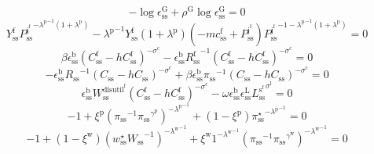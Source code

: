 \begin{equation}
-\log{\epsilon^{\mathrm{G}}_\mathrm{ss}} + {\rho^{\mathrm{G}}} {\log{\epsilon^{\mathrm{G}}_\mathrm{ss}}} = 0
\end{equation}
\begin{equation}
{Y^{\mathrm{f}}_\mathrm{ss}} {{P^{\mathrm{j}^{\mathrm{f}}}_\mathrm{ss}}^{-{\lambda^{\mathrm{p}}}^{-1} \left(1 + \lambda^{\mathrm{p}}\right)}} - {\lambda^{\mathrm{p}}}^{-1} {Y^{\mathrm{f}}_\mathrm{ss}} \left(1 + \lambda^{\mathrm{p}}\right) \left(-{m\!c}^{\mathrm{f}}_\mathrm{ss} + P^{\mathrm{j}^{\mathrm{f}}}_\mathrm{ss}\right) {{P^{\mathrm{j}^{\mathrm{f}}}_\mathrm{ss}}^{-1 - {\lambda^{\mathrm{p}}}^{-1} \left(1 + \lambda^{\mathrm{p}}\right)}} = 0
\end{equation}
\begin{equation}
{\beta} {\epsilon^{\mathrm{b}}_\mathrm{ss}} {\left(C^{\mathrm{f}}_\mathrm{ss} - {h} {C^{\mathrm{f}}_\mathrm{ss}}\right)^{-\sigma^{\mathrm{c}}}} - {\epsilon^{\mathrm{b}}_\mathrm{ss}} {R^{\mathrm{f}}_\mathrm{ss}}^{-1} {\left(C^{\mathrm{f}}_\mathrm{ss} - {h} {C^{\mathrm{f}}_\mathrm{ss}}\right)^{-\sigma^{\mathrm{c}}}} = 0
\end{equation}
\begin{equation}
-{\epsilon^{\mathrm{b}}_\mathrm{ss}} {R_\mathrm{ss}}^{-1} {\left(C_\mathrm{ss} - {h} {C_\mathrm{ss}}\right)^{-\sigma^{\mathrm{c}}}} + {\beta} {\epsilon^{\mathrm{b}}_\mathrm{ss}} {\pi_\mathrm{ss}}^{-1} {\left(C_\mathrm{ss} - {h} {C_\mathrm{ss}}\right)^{-\sigma^{\mathrm{c}}}} = 0
\end{equation}
\begin{equation}
{\epsilon^{\mathrm{b}}_\mathrm{ss}} {W^{\mathrm{disutil}^{\mathrm{f}}}_\mathrm{ss}} {\left(C^{\mathrm{f}}_\mathrm{ss} - {h} {C^{\mathrm{f}}_\mathrm{ss}}\right)^{-\sigma^{\mathrm{c}}}} - {\omega} {\epsilon^{\mathrm{b}}_\mathrm{ss}} {\epsilon^{\mathrm{L}}_\mathrm{ss}} {{L^{\mathrm{s}^{\mathrm{f}}}_\mathrm{ss}}^{\sigma^{\mathrm{l}}}} = 0
\end{equation}
\begin{equation}
-1 + {\xi^{\mathrm{p}}} {\left({\pi_\mathrm{ss}}^{-1} {{\pi_\mathrm{ss}}^{\gamma^{\mathrm{p}}}}\right)^{-{\lambda^{\mathrm{p}}}^{-1}}} + \left(1 - \xi^{\mathrm{p}}\right) {{\pi^{\star}_\mathrm{ss}}^{-{\lambda^{\mathrm{p}}}^{-1}}} = 0
\end{equation}
\begin{equation}
-1 + \left(1 - \xi^{\mathrm{w}}\right) {\left({w^{\star}_\mathrm{ss}} {W_\mathrm{ss}}^{-1}\right)^{-{\lambda^{\mathrm{w}}}^{-1}}} + {\xi^{\mathrm{w}}} {{1}^{-{\lambda^{\mathrm{w}}}^{-1}}} {\left({\pi_\mathrm{ss}}^{-1} {{\pi_\mathrm{ss}}^{\gamma^{\mathrm{w}}}}\right)^{-{\lambda^{\mathrm{w}}}^{-1}}} = 0
\end{equation}
